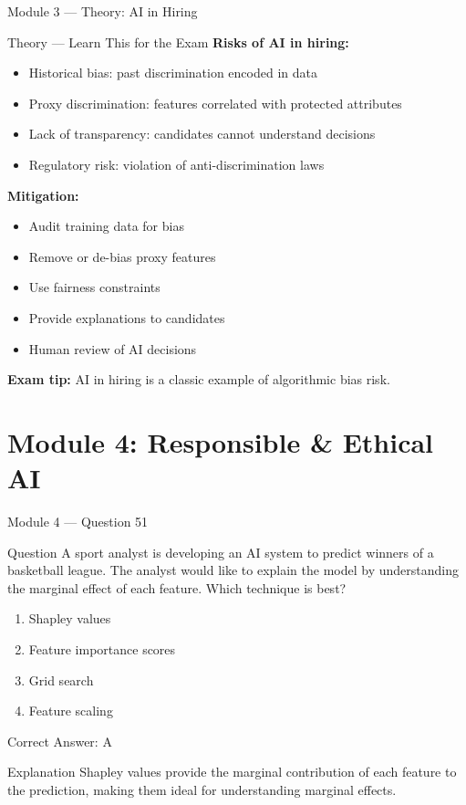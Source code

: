 \documentclass[aspectratio=169,10pt]{beamer}
\newcommand{\question}[1]{%
	\begin{block}{Question}
		#1
	\end{block}
}
\newcommand{\options}[4]{%
	\begin{enumerate}[label=\Alph*.,leftmargin=*]
		\item #1
		\item #2
		\item #3
		\item #4
	\end{enumerate}
}
\newcommand{\answerbox}[1]{%
	\begin{exampleblock}{Correct Answer: #1}
	\end{exampleblock}
}
\newcommand{\explain}[1]{%
	\begin{block}{Explanation}
		\small #1
	\end{block}
}
\newcommand{\theory}[1]{%
	\begin{block}{Theory --- Learn This for the Exam}
		\small #1
	\end{block}
}
\begin{document}
	\begin{frame}{Module 3 --- Theory: AI in Hiring}
		\theory{
			\textbf{Risks of AI in hiring:}
			\begin{itemize}
				\item Historical bias: past discrimination encoded in data
				\item Proxy discrimination: features correlated with protected attributes
				\item Lack of transparency: candidates cannot understand decisions
				\item Regulatory risk: violation of anti-discrimination laws
			\end{itemize}
			\textbf{Mitigation:}
			\begin{itemize}
				\item Audit training data for bias
				\item Remove or de-bias proxy features
				\item Use fairness constraints
				\item Provide explanations to candidates
				\item Human review of AI decisions
			\end{itemize}
			\textbf{Exam tip:} AI in hiring is a classic example of algorithmic bias risk.
		}
	\end{frame}
	
	\section{Module 4: Responsible \& Ethical AI}
	
	\begin{frame}{Module 4 --- Question 51}
		\question{A sport analyst is developing an AI system to predict winners of a basketball league. The analyst would like to explain the model by understanding the marginal effect of each feature. Which technique is best?}
		\options{Shapley values}{Feature importance scores}{Grid search}{Feature scaling}
		\answerbox{A}
		\explain{Shapley values provide the marginal contribution of each feature to the prediction, making them ideal for understanding marginal effects.}
	\end{frame}
	
\end{document}
